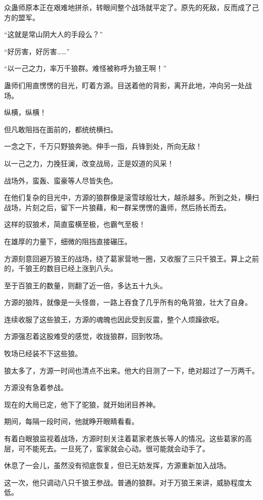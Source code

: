 
\begin{this_body}

众蛊师原本正在艰难地拼杀，转眼间整个战场就平定了。原先的死敌，反而成了己方的盟军。

“这就是常山阴大人的手段么？”

“好厉害，好厉害……”

“以一己之力，率万千狼群。难怪被称呼为狼王啊！”

蛊师们用直愣愣的目光，盯着方源。目送着他的背影，离开此地，冲向另一处战场。

纵横，纵横！

但凡敢阻挡在面前的，都统统横扫。

一念之下，千万只野狼奔驰。伸手一指，兵锋到处，所向无敌！

以一己之力，力挽狂澜，改变战局，正是奴道的风采！

战场外，蛮轰、蛮豪等人尽皆失色。

在他们复杂的目光中，方源的狼群像是滚雪球般壮大，越杀越多。所到之处，横扫战场，片刻之后，留下一片狼藉，和一群呆愣愣的蛊师，然后扬长而去。

这样的驭狼术，简直蛮横至极，也霸气至极！

在雄厚的力量下，细微的阻挡直接碾压。

方源刻意回避万狼王的战场，绕了葛家营地一圈，又收服了三只千狼王。算上之前的，千狼王的数目已经上涨到八头。

至于百狼王的数量，则翻了近一倍，多达五十九头。

方源的狼阵，就像是一头怪兽，一路上吞食了几乎所有的龟背狼，壮大了自身。

连续收服了这些狼王，方源的魂魄也因此受到反震，整个人烦躁欲呕。

方源强忍着这股难受的感觉，收拢狼群，回到牧场。

牧场已经装不下这些狼。

狼太多了，方源一时间也清点不出来。他大约目测了一下，绝对超过了一万两千。

方源没有急着参战。

现在的大局已定，他下了驼狼，就开始闭目养神。

期间，每隔一段时间，他就睁开眼睛看看。

有着白眼狼监视着战场，方源时刻关注着葛家老族长等人的情况。这些葛家的高层，可不能死去。一旦死了，蛮家就会心动。很可能就会动手了。

休息了一会儿，虽然没有彻底恢复，但已无妨发挥，方源重新加入战场。

这一次，他只调动八只千狼王参战。普通的狼群。对于万狼王来讲，威胁程度太低。


\end{this_body}
